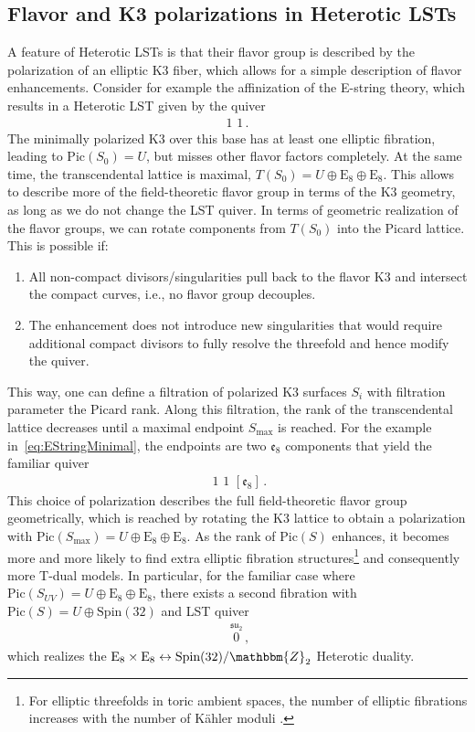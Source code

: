 \documentclass[11pt]{article}
\numberwithin{equation}{section}
\newcommand{\fsu}{\mathfrak{su}}
\newcommand{\fso}{\mathfrak{so}}
\newcommand{\fe}{\mathfrak{e}}
\newcommand{\Pic}{\text{Pic}}
\begin{document}
\subsection{Flavor and K3 polarizations in Heterotic LSTs}
A feature of Heterotic LSTs is that their flavor group is described by the polarization of an elliptic K3 fiber, which allows for a simple description of flavor enhancements. Consider for example the affinization of the E-string theory, which results in a Heterotic LST given by the quiver 
\begin{align}
\label{eq:EStringMinimal}
    1\, \,  1 \, .
\end{align}
The minimally polarized K3 over this base has at least one elliptic fibration, leading to $\Pic(S_0)=U$, but misses other flavor factors completely. At the same time, the transcendental lattice is maximal, $T(S_0) = U \oplus \text{E}_8 \oplus \text{E}_8$.  This allows to describe more of the field-theoretic flavor group in terms of the K3 geometry, as long as we do not change the LST quiver. In terms of geometric realization of the flavor groups, we can rotate components from $T(S_0)$ into the Picard lattice. This is possible if:
\begin{enumerate}
    \item All non-compact divisors/singularities pull back to the flavor K3 and intersect the compact curves, i.e., no flavor group decouples.
    \item The enhancement does not introduce new singularities that would require additional compact divisors to fully resolve the threefold and hence modify the quiver.
\end{enumerate}
This way, one can define a filtration of polarized K3 surfaces $S_i$ with filtration parameter the Picard rank. Along this filtration, the rank of the transcendental lattice decreases until a maximal endpoint $S_\text{max}$ is reached. For the example in~\eqref{eq:EStringMinimal}, the endpoints are two $\fe_8$ components that yield the familiar quiver
\begin{align}
  [\fe_8] \, \,  1 \, \, 1 \, \, [\fe_8] \, .
\end{align}
This choice of polarization describes the full field-theoretic flavor group geometrically, which is reached by rotating the K3 lattice to obtain a polarization with $\Pic(S_{\text{max}})=U \oplus \text{E}_8 \oplus \text{E}_8$. 
As the rank of $\Pic(S)$ enhances, it becomes more and more likely to find extra elliptic fibration structures\footnote{For elliptic threefolds in toric ambient spaces, the number of elliptic fibrations increases with the number of K\"ahler moduli \cite{Anderson:2016cdu,Huang:2019pne}.} and consequently more T-dual models. In particular, for the familiar case where $\Pic(S_{UV})=U\oplus \text{E}_8 \oplus \text{E}_8$, there exists a second fibration with $\Pic(S)= U \oplus \text{Spin}(32)$ and LST quiver 
\begin{align}
    [ \fso_{32} ]~~\overset{\fsu_2}{0} \, ,
\end{align}
which realizes the $\text{E}_8\times \text{E}_8 \leftrightarrow \text{Spin}(32)/\mathbbm{Z}_2$ Heterotic duality.
\end{document}

